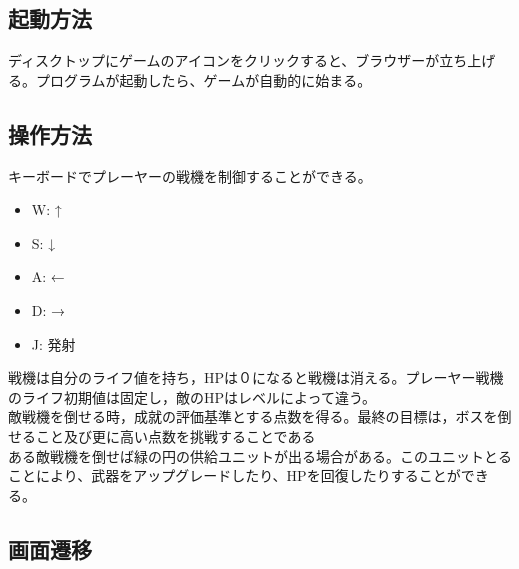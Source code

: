 \subsection{起動方法}
	ディスクトップにゲームのアイコンをクリックすると、ブラウザーが立ち上げる。プログラムが起動したら、ゲームが自動的に始まる。
\subsection{操作方法}
	キーボードでプレーヤーの戦機を制御することができる。\\
	\begin{itemize}
		\item W: ↑ 
		\item S: ↓ 
		\item A: ←
		\item D: →
		\item J: 発射
	\end{itemize}
	戦機は自分のライフ値を持ち，HPは０になると戦機は消える。プレーヤー戦機のライフ初期値は固定し，敵のHPはレベルによって違う。\\
	敵戦機を倒せる時，成就の評価基準とする点数を得る。最終の目標は，ボスを倒せること及び更に高い点数を挑戦することである\\
	ある敵戦機を倒せば緑の円の供給ユニットが出る場合がある。このユニットとることにより、武器をアップグレードしたり、HPを回復したりすることができる。
	
\subsection{画面遷移}

